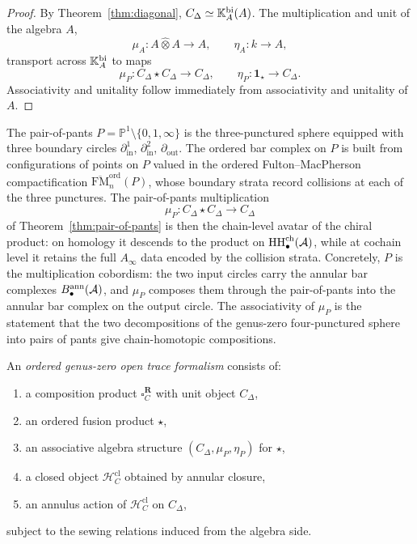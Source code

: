 \begin{proof}
By Theorem~\ref{thm:diagonal}, $C_\Delta\simeq \mathbb{K}_A^{\mathrm{bi}}(A)$. The multiplication and unit
of the algebra $A$,
\[
\mu_A:A\widehat\otimes A\to A,\qquad \eta_A:k\to A,
\]
transport across $\mathbb{K}_A^{\mathrm{bi}}$ to maps
\[
\mu_P:C_\Delta\star C_\Delta\to C_\Delta,\qquad \eta_P:\mathbf 1_\star\to C_\Delta.
\]
Associativity and unitality follow immediately from associativity and unitality of $A$.
\end{proof}

\begin{remark}%
\label{rem:stratified-pants}%
The pair-of-pants $P=\mathbb{P}^1\setminus\{0,1,\infty\}$ is the three-punctured sphere
equipped with three boundary circles $\partial_{\mathrm{in}}^1$, $\partial_{\mathrm{in}}^2$,
$\partial_{\mathrm{out}}$.
The ordered bar complex on $P$ is built from configurations of points on $P$ valued in the
ordered Fulton--MacPherson compactification
$\overline{\mathrm{FM}}_n^{\mathrm{ord}}(P)$, whose boundary strata record collisions
at each of the three punctures.
The pair-of-pants multiplication
\[
\mu_P\colon C_\Delta\star C_\Delta\longrightarrow C_\Delta
\]
of Theorem~\ref{thm:pair-of-pants} is then the chain-level avatar of the chiral product:
on homology it descends to the product on $\operatorname{HH}_\bullet^{\mathrm{ch}}(\mathcal{A})$, while at
cochain level it retains the full $A_\infty$ data encoded by the collision strata.
Concretely, $P$ is the multiplication cobordism: the two input circles carry the
annular bar complexes $B_\bullet^{\mathrm{ann}}(\mathcal{A})$, and $\mu_P$ composes them
through the pair-of-pants into the annular bar complex on the output circle.
The associativity of $\mu_P$ is the statement that the two decompositions of
the genus-zero four-punctured sphere into pairs of pants give chain-homotopic compositions.
\end{remark}

\begin{definition}
An \emph{ordered genus-zero open trace formalism} consists of:
\begin{enumerate}[label=(\roman*)]
\item a composition product $\square_C^{\mathbf R}$ with unit object $C_\Delta$,
\item an ordered fusion product $\star$,
\item an associative algebra structure $(C_\Delta,\mu_P,\eta_P)$ for $\star$,
\item a closed object $\mathcal H_C^{\mathrm{cl}}$ obtained by annular closure,
\item an annulus action of $\mathcal H_C^{\mathrm{cl}}$ on $C_\Delta$,
\end{enumerate}
subject to the sewing relations induced from the algebra side.
\end{definition}

